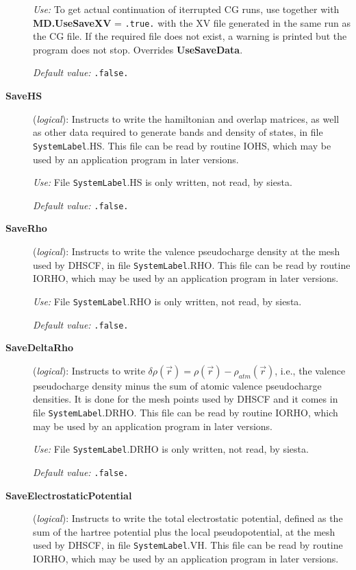 \begin{description}
{\it Use:} To get actual continuation of iterrupted CG runs, use
together with {\bf MD.UseSaveXV} = {\tt .true.} with the XV
file generated in the same run as the CG file.
If the required file does not exist, a warning is
printed but the program does not stop. Overrides {\bf UseSaveData}.

{\it Default value:} {\tt .false.}
        

\item[{\bf SaveHS}] ({\it logical}): 
Instructs to write the hamiltonian and overlap matrices, as well
as other data required to generate bands and density of states,
in file {\tt SystemLabel}.HS. This file can be read by routine IOHS,
which may be used by an application program in later versions.

{\it Use:} File {\tt SystemLabel}.HS is only written, not read, by siesta.

{\it Default value:} {\tt .false.}
        

\item[{\bf SaveRho}] ({\it logical}): 
Instructs to write the valence pseudocharge density at the
mesh used by DHSCF,
in file {\tt SystemLabel}.RHO. This file can be read by routine IORHO,
which may be used by an application program in later versions.

{\it Use:} File {\tt SystemLabel}.RHO is only written, not read, by siesta.

{\it Default value:} {\tt .false.}
        

\item[{\bf SaveDeltaRho}] ({\it logical}): 
Instructs to write $\delta \rho(\vec r) = \rho(\vec r) - \rho_{atm}(\vec r)$,
i.e., the valence pseudocharge density minus the sum of atomic valence
pseudocharge densities. It is done for the mesh points used by DHSCF and it
comes in file {\tt SystemLabel}.DRHO. This file can be read by routine IORHO,
which may be used by an application program in later versions.

{\it Use:} File {\tt SystemLabel}.DRHO is only written, not read, by siesta.

{\it Default value:} {\tt .false.}
        

\item[{\bf SaveElectrostaticPotential}] ({\it logical}): 
Instructs to write the total electrostatic potential, defined as the
sum of the hartree potential plus the local pseudopotential, at the
mesh used by DHSCF,
in file {\tt SystemLabel}.VH. This file can be read by routine IORHO,
which may be used by an application program in later versions.


\end{description}
